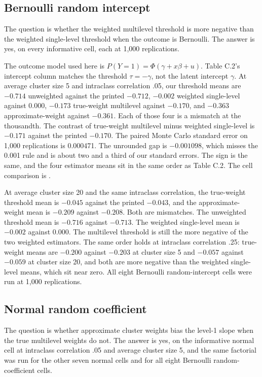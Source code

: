 \subsection{Bernoulli random intercept}

The question is whether the weighted multilevel threshold is more negative
than the weighted single-level threshold when the outcome is Bernoulli.
The answer is yes, on every informative cell, each at 1,000 replications.

The outcome model used here is $P(Y=1)=\Phi(\gamma+x\beta+u)$.
Table C.2's intercept column matches the threshold $\tau=-\gamma$, not the
latent intercept $\gamma$.
At average cluster size 5 and intraclass correlation .05, our threshold means
are $-0.714$ unweighted against the printed $-0.712$, $-0.002$ weighted
single-level against 0.000, $-0.173$ true-weight multilevel against $-0.170$,
and $-0.363$ approximate-weight against $-0.361$.
Each of those four is a mismatch at the thousandth.
The contrast of true-weight multilevel minus weighted single-level is
$-0.171$ against the printed $-0.170$.
The paired Monte Carlo standard error on 1,000 replications is 0.000471.
The unrounded gap is $-0.001098$, which misses the 0.001 rule and is about
two and a third of our standard errors.
The sign is the same, and the four estimator means sit in the same order as
Table C.2.
The cell comparison is .

At average cluster size 20 and the same intraclass correlation, the
true-weight threshold mean is $-0.045$ against the printed $-0.043$, and the
approximate-weight mean is $-0.209$ against $-0.208$.
Both are mismatches.
The unweighted threshold mean is $-0.716$ against $-0.713$.
The weighted single-level mean is $-0.002$ against 0.000.
The multilevel threshold is still the more negative of the two weighted
estimators.
The same order holds at intraclass correlation .25: true-weight means are
$-0.200$ against $-0.203$ at cluster size 5 and $-0.057$ against $-0.059$ at
cluster size 20, and both are more negative than the weighted single-level
means, which sit near zero.
All eight Bernoulli random-intercept cells were run at 1,000 replications.

\subsection{Normal random coefficient}

The question is whether approximate cluster weights bias the level-1 slope
when the true multilevel weights do not.
The answer is yes, on the informative normal cell at intraclass correlation
.05 and average cluster size 5, and the same factorial was run for the other
seven normal cells and for all eight Bernoulli random-coefficient cells.

